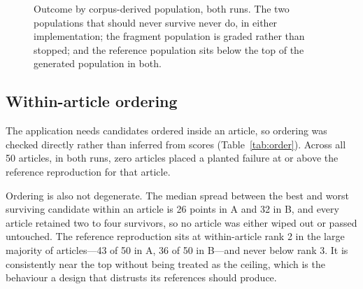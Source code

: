 \documentclass[conference]{IEEEtran}
\begin{document}
\begin{figure}[t]
\caption{Outcome by corpus-derived population, both runs. The two
populations that should never survive never do, in either
implementation; the fragment population is graded rather than stopped;
and the reference population sits below the top of the generated
population in both.}
\label{fig:bands}
\end{figure}

\subsection{Within-article ordering}
The application needs candidates ordered inside an article, so ordering
was checked directly rather than inferred from scores
(Table~\ref{tab:order}). Across all 50 articles, in both runs, zero
articles placed a planted failure at or above the reference reproduction
for that article.

Ordering is also not degenerate. The median spread between the best and
worst surviving candidate within an article is 26 points in A and 32 in
B, and every article retained two to four survivors, so no article was
either wiped out or passed untouched. The reference reproduction sits at
within-article rank 2 in the large majority of articles---43 of 50 in A,
36 of 50 in B---and never below rank 3. It is consistently near the top
without being treated as the ceiling, which is the behaviour a design
that distrusts its references should produce.
\end{document}
